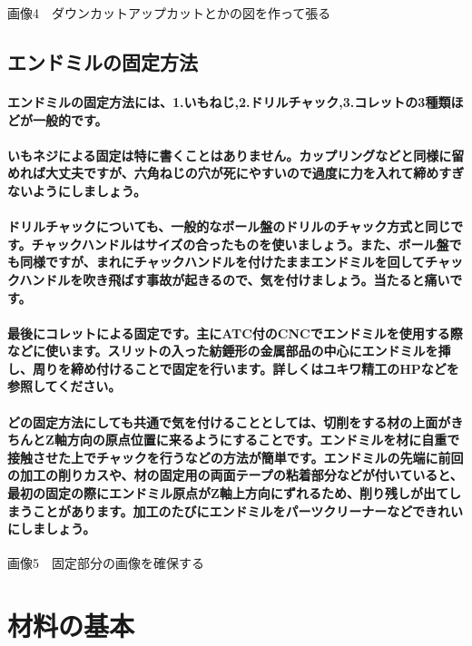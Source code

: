 \documentclass[b5paper, 9pt, twocolumn, titlepage,openany]{jsbook}%
\begin{document}
画像4　ダウンカットアップカットとかの図を作って張る

\subsection{エンドミルの固定方法}

\paragraph{エンドミルの固定方法には、1.いもねじ,2.ドリルチャック,3.コレットの3種類ほどが一般的です。}
\paragraph{いもネジによる固定は特に書くことはありません。カップリングなどと同様に留めれば大丈夫ですが、六角ねじの穴が死にやすいので過度に力を入れて締めすぎないようにしましょう。}
\paragraph{ドリルチャックについても、一般的なボール盤のドリルのチャック方式と同じです。チャックハンドルはサイズの合ったものを使いましょう。また、ボール盤でも同様ですが、まれにチャックハンドルを付けたままエンドミルを回してチャックハンドルを吹き飛ばす事故が起きるので、気を付けましょう。当たると痛いです。}
\paragraph{最後にコレットによる固定です。主にATC付のCNCでエンドミルを使用する際などに使います。スリットの入った紡錘形の金属部品の中心にエンドミルを挿し、周りを締め付けることで固定を行います。詳しくはユキワ精工のHPなどを参照してください。}
\paragraph{どの固定方法にしても共通で気を付けることとしては、切削をする材の上面がきちんとZ軸方向の原点位置に来るようにすることです。エンドミルを材に自重で接触させた上でチャックを行うなどの方法が簡単です。エンドミルの先端に前回の加工の削りカスや、材の固定用の両面テープの粘着部分などが付いていると、最初の固定の際にエンドミル原点がZ軸上方向にずれるため、削り残しが出てしまうことがあります。加工のたびにエンドミルをパーツクリーナーなどできれいにしましょう。}

画像5　固定部分の画像を確保する

\section{材料の基本}
\end{document}
